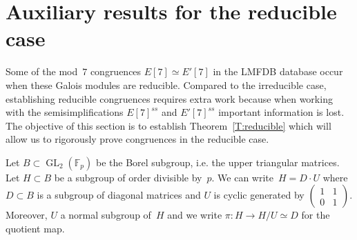 \documentclass[12pt]{amsart}
\newcommand{\F}{\mathbb{F}}
\newcommand{\GL}{\operatorname{GL}}
\def\r3{\sqrt{-3}}
\numberwithin{equation}{section}
\theoremstyle{definition}
\theoremstyle{remark}
\newtheorem{remark}[theorem]{Remark}
\begin{document}

\section{Auxiliary results for the reducible case}

Some of the mod~$7$ congruences 
$E[7] \simeq E'[7]$ in the LMFDB database occur 
when these Galois modules are reducible. Compared to the irreducible case, establishing reducible congruences requires extra work because when working with the semisimplifications $E[7]^{ss}$ and $E'[7]^{ss}$ important information is lost.
The objective of this section is to establish Theorem~\ref{T:reducible} which will allow us to rigorously prove congruences in the reducible case.


Let $B \subset \GL_2(\F_p)$ be the Borel subgroup, i.e. the upper triangular matrices. Let $H \subset B$ be a subgroup of order divisible by~$p$. 
We can write~$H = D\cdot U$ where $D \subset B$ is a subgroup of diagonal matrices and 
$U$ is cyclic generated by $\left(\begin{smallmatrix}
                            1 & 1 \\
                            0 & 1
                            \end{smallmatrix} \right)$.   
Moreover, $U$ a normal subgroup of~$H$ 
and we write $\pi : H \to H/U \simeq D$ for the quotient map.
\end{document}

